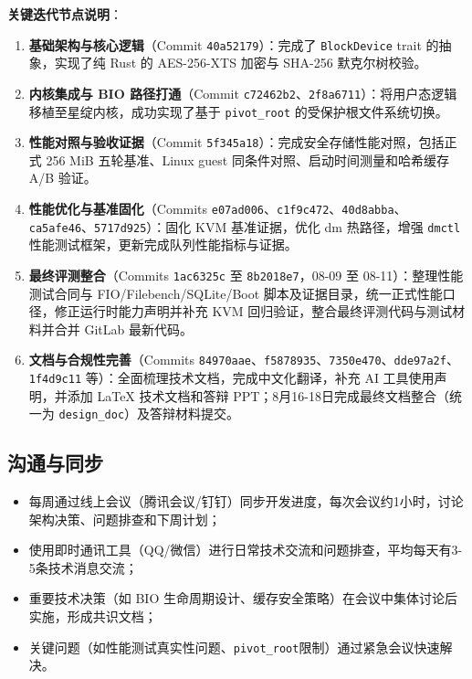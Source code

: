 \textbf{关键迭代节点说明}：
\begin{enumerate}
    \item \textbf{基础架构与核心逻辑}（Commit \texttt{40a52179}）：完成了 \texttt{BlockDevice} trait 的抽象，实现了纯 Rust 的 AES-256-XTS 加密与 SHA-256 默克尔树校验。
    \item \textbf{内核集成与 BIO 路径打通}（Commit \texttt{c72462b2}、\texttt{2f8a6711}）：将用户态逻辑移植至星绽内核，成功实现了基于 \texttt{pivot\_root} 的受保护根文件系统切换。
    \item \textbf{性能对照与验收证据}（Commit \texttt{5f345a18}）：完成安全存储性能对照，包括正式 256 MiB 五轮基准、Linux guest 同条件对照、启动时间测量和哈希缓存 A/B 验证。
    \item \textbf{性能优化与基准固化}（Commits \texttt{e07ad006}、\texttt{c1f9c472}、\texttt{40d8abba}、\texttt{ca5afe46}、\texttt{5717d925}）：固化 KVM 基准证据，优化 dm 热路径，增强 \texttt{dmctl} 性能测试框架，更新完成队列性能指标与证据。
    \item \textbf{最终评测整合}（Commits \texttt{1ac6325c} 至 \texttt{8b2018e7}，08-09 至 08-11）：整理性能测试合同与 FIO/Filebench/SQLite/Boot 脚本及证据目录，统一正式性能口径，修正运行时能力声明并补充 KVM 回归验证，整合最终评测代码与测试材料并合并 GitLab 最新代码。
    \item \textbf{文档与合规性完善}（Commits \texttt{84970aae}、\texttt{f5878935}、\texttt{7350e470}、\texttt{dde97a2f}、\texttt{1f4d9c11} 等）：全面梳理技术文档，完成中文化翻译，补充 AI 工具使用声明，并添加 LaTeX 技术文档和答辩 PPT；8月16-18日完成最终文档整合（统一为 \texttt{design\_doc}）及答辩材料提交。
\end{enumerate}

\subsection{沟通与同步}

\begin{itemize}
    \item 每周通过线上会议（腾讯会议/钉钉）同步开发进度，每次会议约1小时，讨论架构决策、问题排查和下周计划；
    \item 使用即时通讯工具（QQ/微信）进行日常技术交流和问题排查，平均每天有3-5条技术消息交流；
    \item 重要技术决策（如 BIO 生命周期设计、缓存安全策略）在会议中集体讨论后实施，形成共识文档；
    \item 关键问题（如性能测试真实性问题、\texttt{pivot\_root}限制）通过紧急会议快速解决。
\end{itemize}

